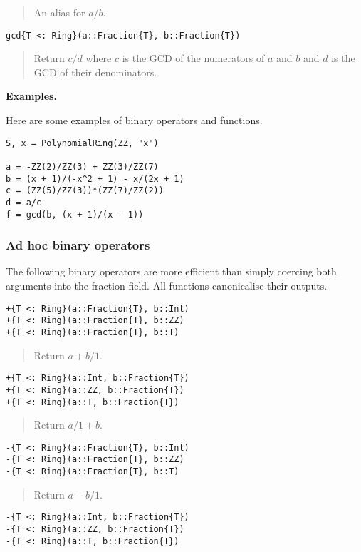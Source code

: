 \documentclass[a4paper,10pt]{article}
\newcommand{\desc}[1]{\vspace{-3mm}\begin{quote}#1\end{quote}}
\begin{document}
{{{\desc{An alias for $a/b$.}

\begin{lstlisting}
gcd{T <: Ring}(a::Fraction{T}, b::Fraction{T})
\end{lstlisting}

\desc{Return $c/d$ where $c$ is the GCD of the numerators of $a$ and $b$ and
$d$ is the GCD of their denominators.}

\textbf{Examples.}

Here are some examples of binary operators and functions.

\begin{lstlisting}
S, x = PolynomialRing(ZZ, "x")

a = -ZZ(2)/ZZ(3) + ZZ(3)/ZZ(7)
b = (x + 1)/(-x^2 + 1) - x/(2x + 1)
c = (ZZ(5)/ZZ(3))*(ZZ(7)/ZZ(2))
d = a/c
f = gcd(b, (x + 1)/(x - 1))
\end{lstlisting}

\subsubsection{Ad hoc binary operators}

The following binary operators are more efficient than simply coercing both
arguments into the fraction field. All functions canonicalise their outputs.

\begin{lstlisting}
+{T <: Ring}(a::Fraction{T}, b::Int)
+{T <: Ring}(a::Fraction{T}, b::ZZ)
+{T <: Ring}(a::Fraction{T}, b::T)
\end{lstlisting}

\desc{Return $a + b/1$.}

\begin{lstlisting}
+{T <: Ring}(a::Int, b::Fraction{T})
+{T <: Ring}(a::ZZ, b::Fraction{T})
+{T <: Ring}(a::T, b::Fraction{T})
\end{lstlisting}

\desc{Return $a/1 + b$.}

\begin{lstlisting}
-{T <: Ring}(a::Fraction{T}, b::Int)
-{T <: Ring}(a::Fraction{T}, b::ZZ)
-{T <: Ring}(a::Fraction{T}, b::T)
\end{lstlisting}

\desc{Return $a - b/1$.}

\begin{lstlisting}
-{T <: Ring}(a::Int, b::Fraction{T})
-{T <: Ring}(a::ZZ, b::Fraction{T})
-{T <: Ring}(a::T, b::Fraction{T})
\end{lstlisting}

}}}
\end{document}
